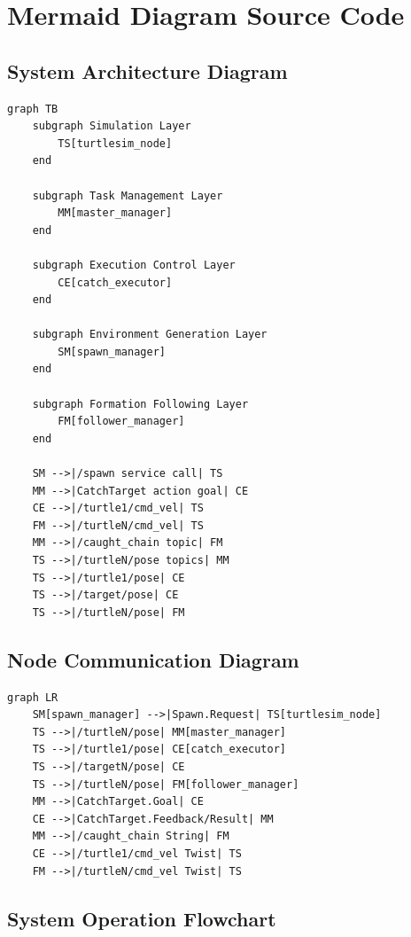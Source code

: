 \documentclass[12pt,a4paper]{article}
\begin{document}
\section{Mermaid Diagram Source Code}
\label{sec:mermaid}

\subsection{System Architecture Diagram}

\begin{lstlisting}[language={},title={System Architecture}]
graph TB
    subgraph Simulation Layer
        TS[turtlesim_node]
    end

    subgraph Task Management Layer
        MM[master_manager]
    end

    subgraph Execution Control Layer
        CE[catch_executor]
    end

    subgraph Environment Generation Layer
        SM[spawn_manager]
    end

    subgraph Formation Following Layer
        FM[follower_manager]
    end

    SM -->|/spawn service call| TS
    MM -->|CatchTarget action goal| CE
    CE -->|/turtle1/cmd_vel| TS
    FM -->|/turtleN/cmd_vel| TS
    MM -->|/caught_chain topic| FM
    TS -->|/turtleN/pose topics| MM
    TS -->|/turtle1/pose| CE
    TS -->|/target/pose| CE
    TS -->|/turtleN/pose| FM
\end{lstlisting}

\subsection{Node Communication Diagram}

\begin{lstlisting}[language={},title={Node Communication}]
graph LR
    SM[spawn_manager] -->|Spawn.Request| TS[turtlesim_node]
    TS -->|/turtleN/pose| MM[master_manager]
    TS -->|/turtle1/pose| CE[catch_executor]
    TS -->|/targetN/pose| CE
    TS -->|/turtleN/pose| FM[follower_manager]
    MM -->|CatchTarget.Goal| CE
    CE -->|CatchTarget.Feedback/Result| MM
    MM -->|/caught_chain String| FM
    CE -->|/turtle1/cmd_vel Twist| TS
    FM -->|/turtleN/cmd_vel Twist| TS
\end{lstlisting}

\subsection{System Operation Flowchart}
\end{document}
